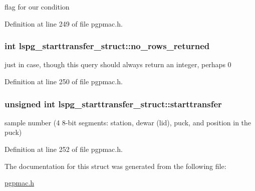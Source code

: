 flag for our condition 



Definition at line 249 of file pgpmac.\-h.

\hypertarget{structlspg__starttransfer__struct_aa384ccd326d9247317f77072b93f94ca}{
\subsubsection[{no\-\_\-rows\-\_\-returned}]{\setlength{\rightskip}{0pt plus 5cm}int lspg\-\_\-starttransfer\-\_\-struct\-::no\-\_\-rows\-\_\-returned}}\label{structlspg__starttransfer__struct_aa384ccd326d9247317f77072b93f94ca}


just in case, though this query should always return an integer, perhaps 0 



Definition at line 250 of file pgpmac.\-h.

\hypertarget{structlspg__starttransfer__struct_af01b6bac6db9830719aef63e552312eb}{
\subsubsection[{starttransfer}]{\setlength{\rightskip}{0pt plus 5cm}unsigned int lspg\-\_\-starttransfer\-\_\-struct\-::starttransfer}}\label{structlspg__starttransfer__struct_af01b6bac6db9830719aef63e552312eb}


sample number (4 8-\/bit segments\-: station, dewar (lid), puck, and position in the puck) 



Definition at line 252 of file pgpmac.\-h.



The documentation for this struct was generated from the following file\-:\begin{DoxyCompactItemize}
\item 
\hyperlink{pgpmac_8h}{pgpmac.\-h}\end{DoxyCompactItemize}
